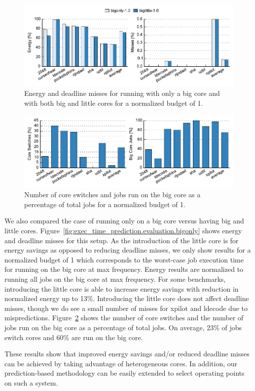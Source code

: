 \begin{figure}
  \begin{center}
    \includegraphics{exec_time_prediction/data/hetero_big_em.pdf}
    \caption{Energy and deadline misses for running with only a big core and
    with both big and little cores for a normalized budget of 1.}
    \label{fig:exec_time_prediction.evaluation.hetero_little_em}
  \end{center}
\end{figure}

\begin{figure}
  \begin{center}
    \includegraphics{exec_time_prediction/data/hetero_big_counts.pdf}
    \caption{Number of core switches and jobs run on the big core as a
    percentage of total jobs for a normalized budget of 1.}
    \label{fig:exec_time_prediction.evaluation.hetero_big_counts}
  \end{center}
\end{figure}

We also compared the case of running only on a big core versus having big and
little cores. Figure~\ref{fig:exec_time_prediction.evaluation.bigonly} shows
energy and deadline misses for this setup. As the introduction of the little
core is for energy savings as opposed to reducing deadline misses, we only show
results for a normalized budget of 1 which corresponds to the worst-case job
execution time for running on the big core at max frequency. Energy results
are normalized to running all jobs on the big core at max frequency. For some
benchmarks, introducing the little core is able to increase energy savings with
reduction in normalized energy up to 13\%. Introducing the little core does not
affect deadline misses, though we do see a small number of misses for xpilot
and ldecode due to mispredictions.
Figure~\ref{fig:exec_time_prediction.evaluation.hetero_big_counts} shows the
number of core switches and the number of jobs run on the big core as a
percentage of total jobs. On average, 23\% of jobs switch cores and 60\% are
run on the big core.

These results show that improved energy savings and/or reduced deadline misses
can be achieved by taking advantage of heterogeneous cores. In addition, our
prediction-based methodology can be easily extended to select operating points
on such a system.
